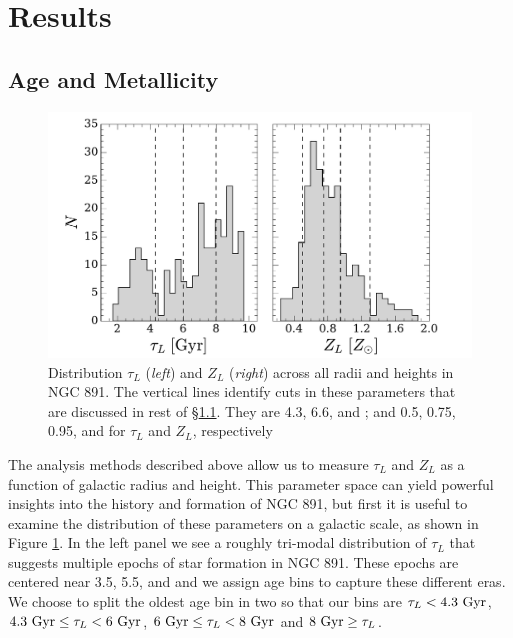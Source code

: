 \section{Results}
\label{891_2:sec:results}

\subsection{Age and Metallicity}
\label{891_2:sec:tZ}

\begin{figure}
  \centering
  \includegraphics[width=\textwidth]{891_2/figs/tauZ_hist.pdf}
  \caption[Global distribution of $\tau_L$ and
    $Z_L$]{\fixspacing\label{891_2:fig:tauZ_hist}Distribution $\tau_L$
    (\emph{left}) and $Z_L$ (\emph{right}) across all radii and
    heights in NGC 891. The vertical lines identify cuts in these
    parameters that are discussed in rest of
    \S\ref{891_2:sec:tZ}. They are 4.3, 6.6, and ; and
    0.5, 0.75, 0.95, and  for $\tau_L$ and $Z_L$,
    respectively}
\end{figure}

The analysis methods described above allow us to measure $\tau_L$ and
$Z_L$ as a function of galactic radius and height. This parameter
space can yield powerful insights into the history and formation of
NGC 891, but first it is useful to examine the distribution of these
parameters on a galactic scale, as shown in Figure
\ref{891_2:fig:tauZ_hist}. In the left panel we see a roughly
tri-modal distribution of $\tau_L$ that suggests multiple epochs of
star formation in NGC 891. These epochs are centered near 3.5, 5.5,
and  and we assign age bins to capture these different
eras. We choose to split the oldest age bin in two so that our bins
are $\tau_L < 4.3~\mathrm{Gyr} $, $4.3~\mathrm{Gyr} \leq\tau_L <
6~\mathrm{Gyr} $, $6~\mathrm{Gyr} \leq\tau_L < 8~\mathrm{Gyr} $ and
$8~\mathrm{Gyr} \geq\tau_L$.

